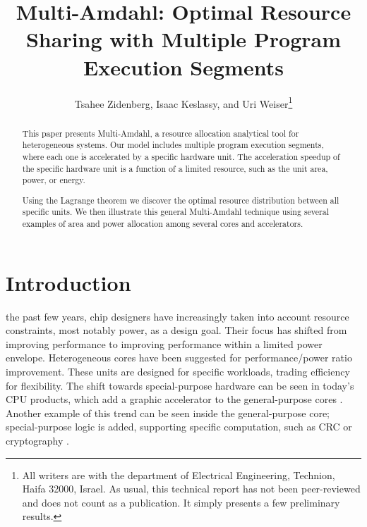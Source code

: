 \documentclass[twocolumn,english]{IEEEtran}
\begin{document}
\newcommand{\eqref}[1]{(\ref{#1})}


\title{Multi-Amdahl: Optimal Resource Sharing with Multiple Program Execution
Segments}


\author{Tsahee Zidenberg, Isaac Keslassy, and Uri Weiser\thanks{All writers are with the department of Electrical Engineering, Technion,
Haifa 32000, Israel. As usual, this technical report has not been
peer-reviewed and does not count as a publication. It simply presents
a few preliminary results.}}


\maketitle
\begin{abstract}
This paper presents Multi-Amdahl, a resource allocation analytical
tool for heterogeneous systems. Our model includes multiple program
execution segments, where each one is accelerated by a specific hardware
unit. The acceleration speedup of the specific hardware unit is a
function of a limited resource, such as the unit area, power, or energy. 

Using the Lagrange theorem we discover the optimal resource distribution
between all specific units. We then illustrate this general Multi-Amdahl
technique using several examples of area and power allocation among
several cores and accelerators.
\end{abstract}

\section{Introduction}

 the past few years, chip designers have increasingly
taken into account resource constraints, most notably power, as a
design goal. Their focus has shifted from improving performance to
improving performance within a limited power envelope. Heterogeneous
cores have been suggested for performance/power ratio improvement.
These units are designed for specific workloads, trading efficiency
for flexibility. The shift towards special-purpose hardware can be
seen in today's CPU products, which add a graphic accelerator to the
general-purpose cores \cite{SandyBridge,Introductiont,AMDFusionFam}.
Another example of this trend can be seen inside the general-purpose
core; special-purpose logic is added, supporting specific computation,
such as CRC or cryptography \cite{Debunkingthe}. 
\end{document}
